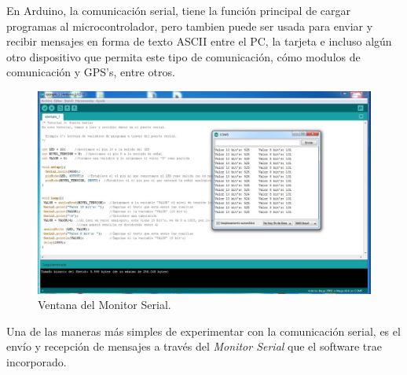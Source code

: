 \documentclass[letterpaper, 10pt]{report}
\begin{document}
En Arduino, la comunicación serial, tiene la función principal de cargar programas al microcontrolador, pero tambien puede ser usada para enviar y recibir mensajes en forma de texto ASCII entre el PC, la tarjeta e incluso algún otro dispositivo que permita este tipo de comunicación, cómo modulos de comunicación y GPS's, entre otros.  
\begin{figure}
\centering
\includegraphics[scale=0.25]{serialcom.jpg}
\caption{Ventana del Monitor Serial.\label{serialcom}}
\end{figure}

Una de las maneras más simples de experimentar con la comunicación serial, es el envío y recepción de mensajes a través del \emph{Monitor Serial} que el software trae incorporado.
\end{document}
